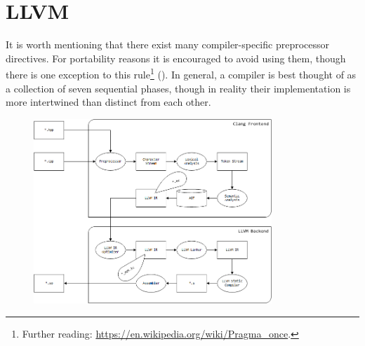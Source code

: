 \section{LLVM}

It is worth mentioning that there exist many compiler-specific preprocessor directives.
For portability reasons it is encouraged to avoid using them, though there is one
exception to this rule\footnote{Further reading: \url{https://en.wikipedia.org/wiki/Pragma_once}.}
(). In general, a compiler is best thought of as a collection
of seven sequential phases, though in reality their implementation is more intertwined
than distinct from each other.

\begin{figure}[ht]
    \centering
    \includegraphics[width=0.8\textwidth]{images/LLVM.png}
\end{figure}

